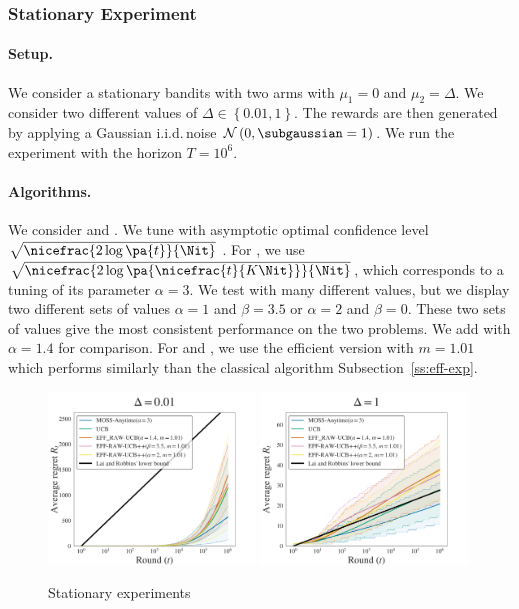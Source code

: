 \subsubsection{Stationary Experiment}

\paragraph{Setup.} We consider a stationary bandits with two arms with $\mu_1= 0$ and $\mu_2 = \Delta$. We consider two different values of $\Delta \in \left\{0.01, 1\right\}$. The rewards are then generated by applying a Gaussian i.i.d.\,noise $\mathcal{N}\left(0,\subgaussian = 1\right)$. We run the experiment with the horizon $T=10^6$.

\paragraph{Algorithms.} We consider \UCB and \MOSSa \citep{degenne2016anytime}. We tune \UCB with asymptotic optimal confidence level $\sqrt{\nicefrac{2\log\pa{t}}{\Nit}}$ \citep{lattimore2020banditbook}. For \MOSSa, we use $\sqrt{\nicefrac{2\log\pa{\nicefrac{t}{K\Nit}}}{\Nit}}$, which corresponds to a tuning of its parameter $\alpha = 3$. We test \RAWUCBpp with many different values, but we display two different sets of values $\alpha = 1$ and $\beta = 3.5$ or $\alpha = 2$ and $\beta=0$. These two sets of values give the most consistent performance on the two problems. We add \RAWUCB with $\alpha = 1.4$ for comparison. For \RAWUCB and \RAWUCBpp , we use the efficient version with $m=1.01$ which performs similarly than the classical algorithm Subsection~\ref{ss:eff-exp}.

\begin{figure}[ht]
\centering
\includegraphics[clip, width= 0.49\textwidth]{2.1Rested/fig/fig_asy0,01.pdf}
\includegraphics[clip, width= 0.49\textwidth]{2.1Rested/fig/fig_asy1.pdf}
\caption{Stationary experiments}
\label{fig:stationary-experiment}
\end{figure}
